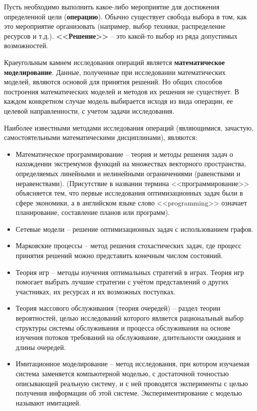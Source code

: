 \documentclass[a4paper,12pt]{report}
\begin{document}
Пусть необходимо выполнить какое-либо мероприятие для достижения определенной цели (\textbf{операцию}). Обычно существует свобода выбора в том, как это мероприятие организовать 
(например, выбор техники, распределение ресурсов и т.д.). \textbf{<<Решение>>} – это какой-то выбор из ряда допустимых возможностей.

Краеугольным камнем исследования операций является \textbf{математическое моделирование}. Данные, полученные при исследовании математических моделей, являются основой для принятия решений. 
Но общих способов построения математических моделей и методов их решения не существует. В каждом конкретном случае модель выбирается исходя из вида операции, ее целевой направленности, 
с учетом задачи исследования.

Наиболее известными методами исследования операций (являющимися, зачастую, самостоятельными математическими дисциплинами), являются:
\begin{itemize}
\item Математическое программирование – теория и методы решения задач о нахождении экстремумов функций на множествах векторного пространства, определяемых линейными и нелинейными ограничениями 
(равенствами и неравенствами). (Присутствие в названии термина <<программирование>> объясняется тем, что первые исследования оптимизационных задач были в сфере экономики, а в английском языке 
слово <<programming>> означает планирование, составление планов или программ).
\item Сетевые модели – решение оптимизационных задач с использованием графов.
\item Марковские процессы – метод решения стохастических задач, где процесс принятия решений можно представить конечным числом состояний.
\item Теория игр – методы изучения оптимальных стратегий в играх. Теория игр помогает выбрать лучшие стратегии с учётом представлений о других участниках, их ресурсах и их возможных поступках.
\item Теория массового обслуживания (теория очередей) – раздел теории вероятностей, целью исследований которого является рациональный выбор структуры системы обслуживания и процесса обслуживания на 
основе изучения потоков требований на обслуживание, длительности ожидания и длины очередей.
\item Имитационное моделирование – метод исследования, при котором изучаемая система заменяется компьютерной моделью, с достаточной точностью описывающей реальную систему, и с ней проводятся эксперименты 
с целью получения информации об этой системе. Экспериментирование с моделью называют имитацией.
\end{itemize}
\end{document}
